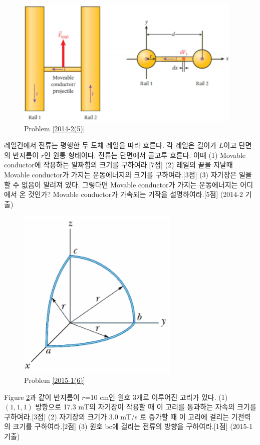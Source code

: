 \begin{problem}\label{2014-2(5)}
\begin{figure}[h]
\centering\includegraphics[scale=0.8]{Pictures/2014-2(5).PNG}
\caption{Problem \ref{2014-2(5)}}
\label{fig:2014-2(5)}
\end{figure}
레일건에서 전류는 평행한 두 도체 레일을 따라 흐른다. 각 레일은 길이가 $L$이고 단면의 반지름이 $r$인 원통 형태이다. 전류는 단면에서 골고루 흐른다. 이때 (1) Movable conductor에 작용하는 알짜힘의 크기를 구하여라.[7점] (2) 레일의 끝을 지날때 Movable conductor가 가지는 운동에너지의 크기를 구하여라.[3점] (3) 자기장은 일을 할 수 없음이 알려져 있다. 그렇다면 Movable conductor가 가지는 운동에너지는 어디에서 온 것인가? Movable conductor가 가속되는 기작을 설명하여라.[5점]
(2014-2 기출)
\end{problem}
\begin{problem}\label{2015-1(6)}
\begin{figure}[h]
\centering\includegraphics[scale=0.6]{Pictures/2015-1(6).PNG}
\caption{Problem \ref{2015-1(6)}}
\label{fig:2015-1(6)}
\end{figure}
Figure \ref{fig:2015-1(6)}과 같이 반지름이 $r$=10 cm인 원호 3개로 이루어진 고리가 있다. (1) $(1,1,1)$ 방향으로 17.3 mT의 자기장이 작용할 때 이 고리를 통과하는 자속의 크기를 구하여라.[3점] (2) 자기장의 크기가 3.0 mT/s 로 증가할 때 이 고리에 걸리는 기전력의 크기를 구하여라.[2점]  (3) 원호 bc에 걸리는 전류의 방향을 구하여라.[1점] (2015-1 기출)
\end{problem}

